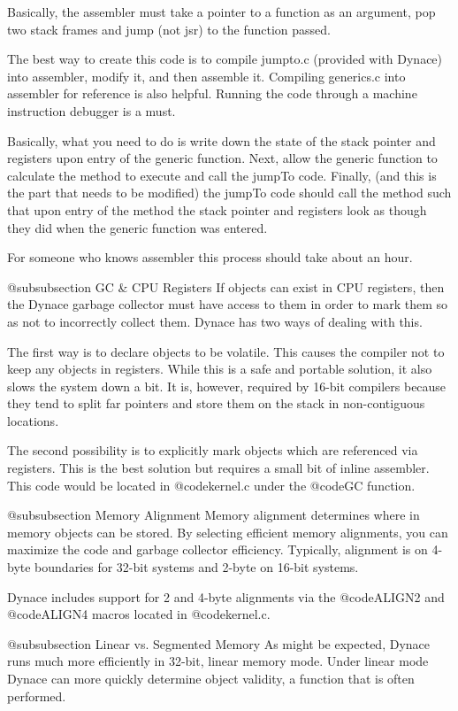 Basically, the assembler must take a pointer to a function as an
argument, pop two stack frames and jump (not jsr) to the function
passed.

The best way to create this code is to compile jumpto.c (provided
with Dynace) into assembler, modify it, and then assemble it.  Compiling
generics.c into assembler for reference is also helpful.  Running
the code through a machine instruction debugger is a must.

Basically, what you need to do is write down the state of the stack
pointer and registers upon entry of the generic function.  Next, allow
the generic function to calculate the method to execute and call the
jumpTo code.  Finally, (and this is the part that needs to be modified)
the jumpTo code should call the method such that upon entry of the
method the stack pointer and registers look as though they did when
the generic function was entered.

For someone who knows assembler this process should take about an hour.

@subsubsection  GC & CPU Registers
If objects can exist in CPU registers, then the Dynace garbage collector must
have access to them in order to mark them so as not to incorrectly collect
them.  Dynace has two ways of dealing with this.

The first way is to declare objects to be volatile.  This causes the
compiler not to keep any objects in registers.  While this is a safe
and portable solution, it also slows the system down a bit.  It is,
however, required by 16-bit compilers because they tend to split
far pointers and store them on the stack in non-contiguous locations.

The second possibility is to explicitly mark objects which are
referenced via registers.  This is the best solution but requires
a small bit of inline assembler.  This code would be located in
@code{kernel.c} under the @code{GC} function.

@subsubsection Memory Alignment
Memory alignment determines where in memory objects can be stored.
By selecting efficient memory alignments, you can maximize the code
and garbage collector efficiency.  Typically, alignment is on
4-byte boundaries for 32-bit systems and 2-byte on 16-bit systems.

Dynace includes support for 2 and 4-byte alignments via the
@code{ALIGN2} and @code{ALIGN4} macros located in @code{kernel.c}.


@subsubsection  Linear vs. Segmented Memory
As might be expected, Dynace runs much more efficiently in 32-bit,
linear memory mode.  Under linear mode Dynace can more quickly determine
object validity, a function that is often performed.


